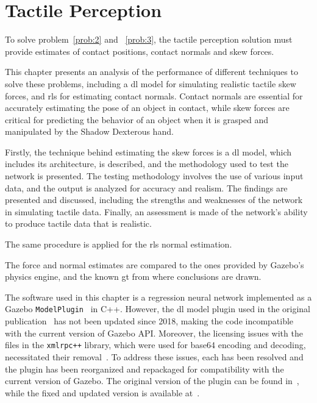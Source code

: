 \chapter{Tactile Perception} \label{ch:1-tactile-perception}

To solve problem~\ref{prob:2} and ~\ref{prob:3}, the tactile perception solution must provide estimates of contact positions, contact normals and skew forces. \medskip

This chapter presents an analysis of the performance of different techniques to solve these problems, including a \gls{dl} model for simulating realistic tactile skew forces, and \gls{rls} for estimating contact normals. Contact normals are essential for accurately estimating the pose of an object in contact, while skew forces are critical for predicting the behavior of an object when it is grasped and manipulated by the Shadow Dexterous hand. \medskip

Firstly, the technique behind estimating the skew forces is a \gls{dl} model, which includes its architecture, is described, and the methodology used to test the network is presented. The testing methodology involves the use of various input data, and the output is analyzed for accuracy and realism. The findings are presented and discussed, including the strengths and weaknesses of the network in simulating tactile data. Finally, an assessment is made of the network's ability to produce tactile data that is realistic. \medskip

The same procedure is applied for the \gls{rls} normal estimation.\medskip

The force and normal estimates are compared to the ones provided by Gazebo's physics engine, and the known \gls{gt} from where conclusions are drawn. \medskip

The software used in this chapter is a regression neural network implemented as a Gazebo \texttt{ModelPlugin}~\cite{gazebo-model-plugin} in C++. However, the \gls{dl} model plugin used in the original publication~\cite{simulation-of-the-syntouch-biotac-sensor} has not been updated since 2018, making the code incompatible with the current version of Gazebo API. Moreover, the licensing issues with the files in the \texttt{xmlrpc++} library, which were used for base64 encoding and decoding, necessitated their removal~\cite{base64-encoding-decoding-licensing-issue}. To address these issues, each has been resolved and the plugin has been reorganized and repackaged for compatibility with the current version of Gazebo. The original version of the plugin can be found in~\cite{ruppel-philipp-biotac-gazebo-plugin}, while the fixed and updated version is available at~\cite{melbye-staven-biotac-sim-plugin}. \medskip

